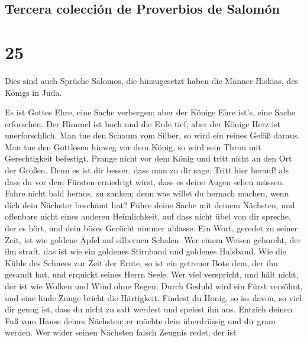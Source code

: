 \hypertarget{tercera-colecciuxf3n-de-proverbios-de-salomuxf3n}{%
\subsection{Tercera colección de Proverbios de
Salomón}\label{tercera-colecciuxf3n-de-proverbios-de-salomuxf3n}}

\hypertarget{section-24}{%
\section{25}\label{section-24}}

 Dies sind auch Sprüche Salomos, die hinzugesetzt haben
die Männer Hiskias, des Königs in Juda.

 Es ist Gottes Ehre, eine Sache verbergen; aber der Könige
Ehre ist's, eine Sache erforschen.  Der Himmel ist hoch
und die Erde tief; aber der Könige Herz ist unerforschlich.
 Man tue den Schaum vom Silber, so wird ein reines Gefäß
daraus.  Man tue den Gottlosen hinweg vor dem König, so
wird sein Thron mit Gerechtigkeit befestigt.  Prange nicht
vor dem König und tritt nicht an den Ort der Großen.  Denn
es ist dir besser, dass man zu dir sage: Tritt hier herauf! als dass du
vor dem Fürsten erniedrigt wirst, dass es deine Augen sehen müssen.
 Fahre nicht bald heraus, zu zanken; denn was willst du
hernach machen, wenn dich dein Nächster beschämt hat? 
Führe deine Sache mit deinem Nächsten, und offenbare nicht eines anderen
Heimlichkeit,  auf dass nicht übel von dir spreche, der
es hört, und dein böses Gerücht nimmer ablasse.  Ein
Wort, geredet zu seiner Zeit, ist wie goldene Äpfel auf silbernen
Schalen.  Wer einem Weisen gehorcht, der ihn straft, das
ist wie ein goldenes Stirnband und goldenes Halsband. 
Wie die Kühle des Schnees zur Zeit der Ernte, so ist ein getreuer Bote
dem, der ihn gesandt hat, und erquickt seines Herrn Seele.
 Wer viel verspricht, und hält nicht, der ist wie Wolken
und Wind ohne Regen.  Durch Geduld wird ein Fürst
versöhnt, und eine linde Zunge bricht die Härtigkeit. 
Findest du Honig, so iss davon, so viel dir genug ist, dass du nicht zu
satt werdest und speiest ihn aus.  Entzieh deinen Fuß vom
Hause deines Nächsten; er möchte dein überdrüssig und dir gram werden.
 Wer wider seinen Nächsten falsch Zeugnis redet, der ist
